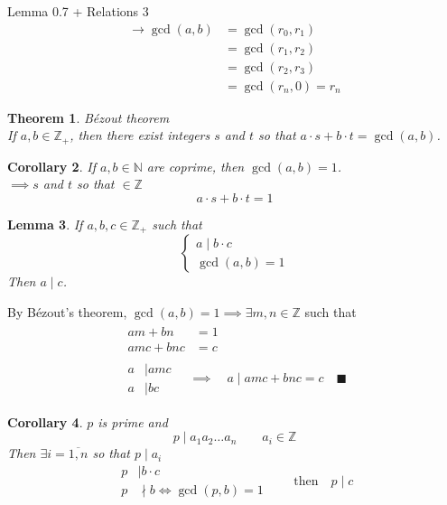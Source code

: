 \documentclass[letterpaper, 12pt]{article}
\newtheorem{theorem}{Theorem}[section]
\newtheorem{lemma}[theorem]{Lemma}
\newtheorem{corollary}[theorem]{Corollary}
\newenvironment{proof}[1][Proof]{\begin{trivlist}
\item[\hskip \labelsep {\bfseries #1}]}{\end{trivlist}}
\newcommand{\qed}{\quad \blacksquare}
\newcommand{\then}{\rightarrow}
\newcommand{\N}{\mathbb{N}}
\newcommand{\Z}{\mathbb{Z}}
\newcommand{\0}{\emptyset}
\begin{document}
    \begin{proof}
        Lemma 0.7 + Relations 3
        \begin{align*}
            \then \gcd(a, b) &= \gcd(r_0, r_1) \\
            &= \gcd(r_1, r_2) \\
            &= \gcd(r_2, r_3) \\
            &= \gcd(r_n, 0) = r_n
        \end{align*}
    \end{proof}
    \begin{theorem}
        Bézout theorem \\
        If $a, b \in \Z_+$, then there exist integers $s$ and $t$ so that 
        $a \cdot s + b \cdot t = \gcd(a, b)$.
    \end{theorem}
    \begin{corollary}
        If $a, b \in \N$ are coprime, then $\gcd(a, b) = 1$. \\
        $\implies s$ and $t$ so that $\in \Z$
        \[a \cdot s + b \cdot t = 1\]
    \end{corollary}
    \begin{lemma}
        If $a, b, c \in \Z_+$ such that 
        \[\begin{cases}
            a \mid b \cdot c \\
            \gcd(a, b) = 1
        \end{cases}\]
        Then $a \mid c$.
    \end{lemma}
    \begin{proof}
        By Bézout's theorem, $\gcd(a, b) = 1 \implies \exists m, n \in \Z$ such that 
        \begin{gather*}
            \begin{aligned}
                am + bn &= 1 \\
                amc + bnc &= c
            \end{aligned} \\
            \begin{aligned}
                a &\mid amc \\
                a &\mid bc
            \end{aligned} \quad \implies \quad a \mid amc + bnc = c \qed
        \end{gather*}
    \end{proof}
    \begin{corollary}
        $p$ is prime and 
        \[p \mid a_1 a_2 \dots a_n \qquad a_i \in \Z\]
        Then $\exists i = \overline{1, n}$ so that $p \mid a_i$
        \[\begin{aligned}
            p &\mid b \cdot c \\
            p &\nmid b \iff \gcd(p, b) = 1
        \end{aligned} \qquad \text{then} \quad p \mid c\]
    \end{corollary}
\end{document}
